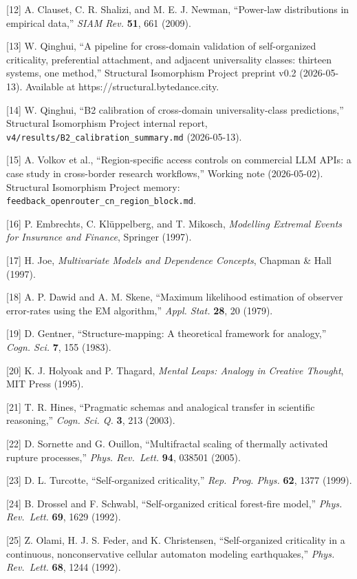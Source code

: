 \documentclass[
  letterpaper,
  11pt]{article}
\begin{document}
{[}12{]} A. Clauset, C. R. Shalizi, and M. E. J. Newman, ``Power-law
distributions in empirical data,'' \emph{SIAM Rev.} \textbf{51}, 661
(2009).

{[}13{]} W. Qinghui, ``A pipeline for cross-domain validation of
self-organized criticality, preferential attachment, and adjacent
universality classes: thirteen systems, one method,'' Structural
Isomorphism Project preprint v0.2 (2026-05-13). Available at
https://structural.bytedance.city.

{[}14{]} W. Qinghui, ``B2 calibration of cross-domain universality-class
predictions,'' Structural Isomorphism Project internal report,
\texttt{v4/results/B2\_calibration\_summary.md} (2026-05-13).

{[}15{]} A. Volkov et al., ``Region-specific access controls on
commercial LLM APIs: a case study in cross-border research workflows,''
Working note (2026-05-02). Structural Isomorphism Project memory:
\texttt{feedback\_openrouter\_cn\_region\_block.md}.

{[}16{]} P. Embrechts, C. Klüppelberg, and T. Mikosch, \emph{Modelling
Extremal Events for Insurance and Finance}, Springer (1997).

{[}17{]} H. Joe, \emph{Multivariate Models and Dependence Concepts},
Chapman \& Hall (1997).

{[}18{]} A. P. Dawid and A. M. Skene, ``Maximum likelihood estimation of
observer error-rates using the EM algorithm,'' \emph{Appl. Stat.}
\textbf{28}, 20 (1979).

{[}19{]} D. Gentner, ``Structure-mapping: A theoretical framework for
analogy,'' \emph{Cogn. Sci.} \textbf{7}, 155 (1983).

{[}20{]} K. J. Holyoak and P. Thagard, \emph{Mental Leaps: Analogy in
Creative Thought}, MIT Press (1995).

{[}21{]} T. R. Hines, ``Pragmatic schemas and analogical transfer in
scientific reasoning,'' \emph{Cogn. Sci. Q.} \textbf{3}, 213 (2003).

{[}22{]} D. Sornette and G. Ouillon, ``Multifractal scaling of thermally
activated rupture processes,'' \emph{Phys. Rev.~Lett.} \textbf{94},
038501 (2005).

{[}23{]} D. L. Turcotte, ``Self-organized criticality,''
\emph{Rep.~Prog. Phys.} \textbf{62}, 1377 (1999).

{[}24{]} B. Drossel and F. Schwabl, ``Self-organized critical
forest-fire model,'' \emph{Phys. Rev.~Lett.} \textbf{69}, 1629 (1992).

{[}25{]} Z. Olami, H. J. S. Feder, and K. Christensen, ``Self-organized
criticality in a continuous, nonconservative cellular automaton modeling
earthquakes,'' \emph{Phys. Rev.~Lett.} \textbf{68}, 1244 (1992).
\end{document}
